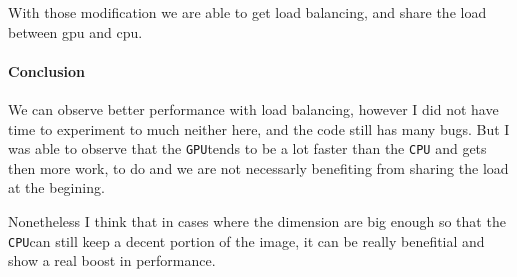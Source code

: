 \documentclass{report}
\def\CPU{\texttt{CPU}}
\def\GPU{\texttt{GPU}}
\begin{document}
With those modification we are able to get load balancing, and share the load between gpu and cpu.


\paragraph{Conclusion} 
We can observe better performance with load balancing, however I did not have time to experiment to much 
neither here, and the code still has many bugs.
But I was able to observe that the \GPU tends to be a lot faster than the \CPU{} and gets then more work,
to do and we are not necessarly benefiting from sharing the load at the begining.

Nonetheless I think that in cases where the dimension are big enough so that the \CPU can still keep 
a decent portion of the image, it can be really benefitial and show a real boost in performance.
\end{document}
